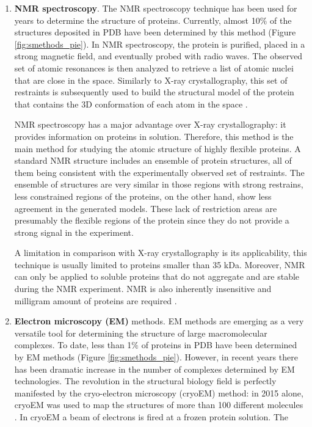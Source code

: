 \documentclass[11pt, b5paper,twoside]{tesi_upf}
\begin{document}
\begin{enumerate}[label=(\alph*)]
\item \textbf{NMR spectroscopy}. The NMR spectroscopy technique has been used for years to determine the structure of proteins. Currently, almost 10$\%$ of the structures deposited in PDB have been determined by this method (Figure \ref{fig:smethods_pie}). In NMR spectroscopy, the protein is purified, placed in a strong magnetic field, and eventually probed with radio waves. The observed set of atomic resonances is then analyzed to retrieve a list of atomic nuclei that are close in the space. Similarly to X-ray crystallography, this set of restraints is subsequently used to build the structural model of the protein that contains the 3D conformation of each atom in the space \cite{Wider2000}.
\par NMR spectroscopy has a major advantage over X-ray crystallography: it provides information on proteins in solution. Therefore, this method is the main method for studying the atomic structure of highly flexible proteins. A standard NMR structure includes an ensemble of protein structures, all of them being consistent with the experimentally observed set of restraints. The ensemble of structures are very similar in those regions with strong restrains, less constrained regions of the proteins, on the other hand, show less agreement in the generated models. These lack of restriction areas are presumably the flexible regions of the protein since they do not provide a strong signal in the experiment. 
\par A limitation in comparison with X-ray crystallography is its applicability, this technique is usually limited to proteins smaller than 35 kDa. Moreover, NMR can only be applied to soluble proteins that do not aggregate and are stable during the NMR experiment. NMR is also inherently insensitive and milligram amount of proteins are required \cite{Wider2000}. 
\item \textbf{Electron microscopy (EM)} methods. EM methods are emerging as a very versatile tool for determining the structure of large macromolecular complexes. To date, less than 1$\%$ of proteins in PDB have been determined by EM methods (Figure \ref{fig:smethods_pie}). However, in recent years there has been dramatic increase in the number of complexes determined by EM technologies. The revolution in the structural biology field is perfectly manifested by the cryo-electron microscopy (cryoEM) method: in 2015 alone, cryoEM was used to map the structures of more than 100 different molecules \cite{CryoEM}. In cryoEM a beam of electrons is fired at a frozen protein solution. The

\end{enumerate}
\end{document}
